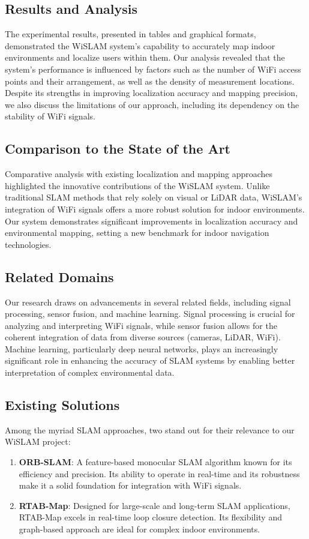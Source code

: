 \documentclass[
	a4paper, %
	11pt, %
	unnumberedsections, %
	twoside, %
]{LTJournalArticle}
\begin{document}
\subsection{Results and Analysis}
The experimental results, presented in tables and graphical formats, demonstrated the WiSLAM system's capability to accurately map indoor environments and localize users within them. Our analysis revealed that the system's performance is influenced by factors such as the number of WiFi access points and their arrangement, as well as the density of measurement locations. Despite its strengths in improving localization accuracy and mapping precision, we also discuss the limitations of our approach, including its dependency on the stability of WiFi signals.

\subsection{Comparison to the State of the Art}
Comparative analysis with existing localization and mapping approaches highlighted the innovative contributions of the WiSLAM system. Unlike traditional SLAM methods that rely solely on visual or LiDAR data, WiSLAM's integration of WiFi signals offers a more robust solution for indoor environments. Our system demonstrates significant improvements in localization accuracy and environmental mapping, setting a new benchmark for indoor navigation technologies.

\subsection{Related Domains}
Our research draws on advancements in several related fields, including signal processing, sensor fusion, and machine learning. Signal processing is crucial for analyzing and interpreting WiFi signals, while sensor fusion allows for the coherent integration of data from diverse sources (cameras, LiDAR, WiFi). Machine learning, particularly deep neural networks, plays an increasingly significant role in enhancing the accuracy of SLAM systems by enabling better interpretation of complex environmental data.

\subsection{Existing Solutions}
Among the myriad SLAM approaches, two stand out for their relevance to our WiSLAM project:

\begin{enumerate}
	\item \textbf{ORB-SLAM}: A feature-based monocular SLAM algorithm known for its efficiency and precision. Its ability to operate in real-time and its robustness make it a solid foundation for integration with WiFi signals.
	\item \textbf{RTAB-Map}: Designed for large-scale and long-term SLAM applications, RTAB-Map excels in real-time loop closure detection. Its flexibility and graph-based approach are ideal for complex indoor environments.
\end{enumerate}
\end{document}
